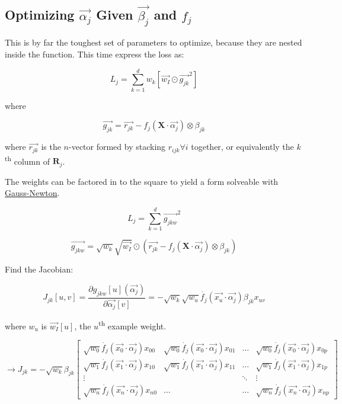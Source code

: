 \documentclass[12pt]{article}
\begin{document}
\subsection{Optimizing $\vec{\alpha_j}$ Given $\vec{\beta_j}$ and $f_j$}

This is by far the toughest set of parameters to optimize, because they are nested inside the function. This time express the loss as:

$$L_j = \sum_{k=1}^d w_k [\vec{w_I} \odot \vec{g_{jk}}^2]$$

where

$$ \vec{g_{jk}} = \vec{r_{jk}} - f_j(\pmb{X} \cdot \vec{\alpha_j}) \otimes \beta_{jk}$$

where $\vec{r_{jk}}$ is the $n$-vector formed by stacking $r_{ijk} \forall i$ together, or equivalently the $k$\textsuperscript{th} column of $\pmb{R}_j$.

The weights can be factored in to the square to yield a form solveable with \href{https://en.wikipedia.org/wiki/Gauss%E2%80%93Newton_algorithm#Description}{Gauss-Newton}.

$$L_j = \sum_{k=1}^d \vec{g_{jkw}}^2$$

$$\vec{g_{jkw}} = \sqrt{w_k} \sqrt{\vec{w_I}} \odot (\vec{r_{jk}} - f_j(\pmb{X} \cdot \vec{\alpha_j}) \otimes \beta_{jk})$$

Find the Jacobian:

$$J_{jk}[u,v] = \frac{\partial g_{jkw}[u](\vec{\alpha_j})}{\partial \vec{\alpha_j}[v]} = -\sqrt{w_k} \sqrt{w_u} \dot{f_j}(\vec{x_u} \cdot \vec{\alpha_j}) \beta_{jk} x_{uv}$$

where $w_u$ is $\vec{w_I}[u]$, the $u$\textsuperscript{th} example weight.

\[
\rightarrow J_{jk} = -\sqrt{w_k} \beta_{jk}
\begin{bmatrix}
	\sqrt{w_0} \dot{f_j}(\vec{x_0} \cdot \vec{\alpha_j}) x_{00} & \sqrt{w_0} \dot{f_j}(\vec{x_0} \cdot \vec{\alpha_j}) x_{01} & \dots & \sqrt{w_0} \dot{f_j}(\vec{x_0} \cdot \vec{\alpha_j}) x_{0p} \\
    \sqrt{w_1} \dot{f_j}(\vec{x_1} \cdot \vec{\alpha_j}) x_{10} & \sqrt{w_1} \dot{f_j}(\vec{x_1} \cdot \vec{\alpha_j}) x_{11} & \dots & \sqrt{w_1} \dot{f_j}(\vec{x_1} \cdot \vec{\alpha_j}) x_{1p}\\
    \vdots & & \ddots & \vdots\\
    \sqrt{w_n} \dot{f_j}(\vec{x_n} \cdot \vec{\alpha_j}) x_{n0} & \hdots & \hdots & \sqrt{w_n} \dot{f_j}(\vec{x_n} \cdot \vec{\alpha_j}) x_{np}
\end{bmatrix}
\]
\end{document}
